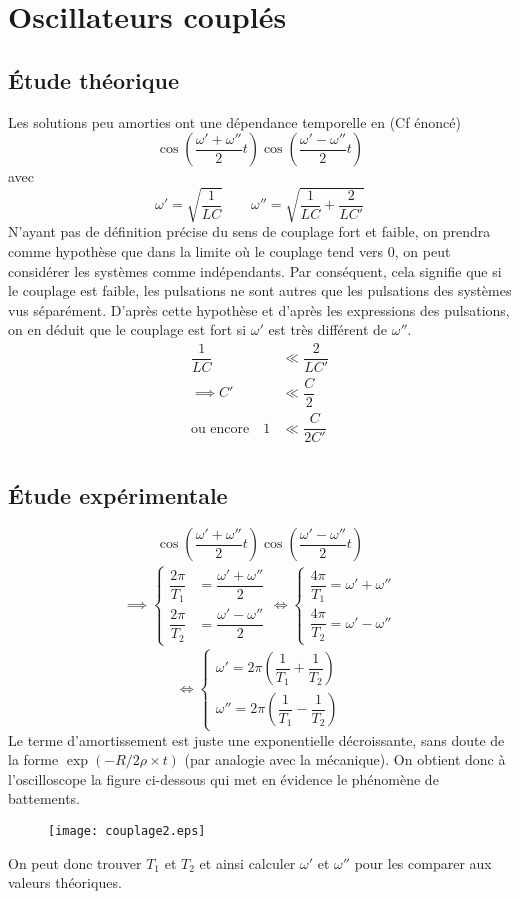 \documentclass[12pt,a4paper]{article}
\begin{document}
	\section{Oscillateurs couplés}
	\subsection{Étude théorique}
	Les solutions peu amorties ont une dépendance temporelle en (Cf énoncé)
	$$\cos\left(\dfrac{\omega'+\omega''}{2}t\right)\cos\left(\dfrac{\omega'-\omega''}{2}t\right)$$
	avec
	$$\omega'=\sqrt{\dfrac{1}{LC}} \qquad \omega''=\sqrt{\dfrac{1}{LC}+\dfrac{2}{LC'}}$$
	N'ayant pas de définition précise du sens de couplage fort et faible, on prendra comme hypothèse que dans la limite où le couplage tend vers 0, on peut considérer les systèmes comme indépendants. Par conséquent, cela signifie que si le couplage est faible, les pulsations ne sont autres que les pulsations des systèmes vus séparément. D'après cette hypothèse et d'après les expressions des pulsations, on en déduit que le couplage est fort si $\omega'$ est très différent de $\omega''$.
	\begin{align*}
	\dfrac{1}{LC}&\ll\dfrac{2}{LC'}\\
	\implies C'&\ll\dfrac{C}{2}\\
	\text{ou encore} \quad 1&\ll\dfrac{C}{2C'}\\
	\end{align*}
	\subsection{Étude expérimentale}
	$$\cos\left(\dfrac{\omega'+\omega''}{2}t\right)\cos\left(\dfrac{\omega'-\omega''}{2}t\right)$$
	\begin{align*}
	\implies
	\begin{cases}
	\dfrac{2\pi}{T_1}&=\dfrac{\omega'+\omega''}{2}\\[1em]
	\dfrac{2\pi}{T_2}&=\dfrac{\omega'-\omega''}{2}
	\end{cases}
	\iff
	\begin{cases}
	\dfrac{4\pi}{T_1}=\omega'+\omega''\\[1em]
	\dfrac{4\pi}{T_2}=\omega'-\omega''
	\end{cases}
	\end{align*}
	\begin{equation*}
	\iff
	\begin{cases}
	\omega'=2\pi\left(\dfrac{1}{T_1}+\dfrac{1}{T_2}\right)\\[1em]
	\omega''=2\pi\left(\dfrac{1}{T_1}-\dfrac{1}{T_2}\right)
	\end{cases}
	\end{equation*}
	Le terme d'amortissement est juste une exponentielle décroissante, sans doute de la forme $\exp(-R/2\rho\times t)$ (par analogie avec la mécanique).
	On obtient donc à l'oscilloscope la figure ci-dessous qui met en évidence le phénomène de battements.
	\begin{figure}[h]
		\centering
		\texttt{[image: couplage2.eps]}
	\end{figure}
	On peut donc trouver $T_1$ et $T_2$ et ainsi calculer $\omega'$ et $\omega''$ pour les comparer aux valeurs théoriques.
	
\end{document}
